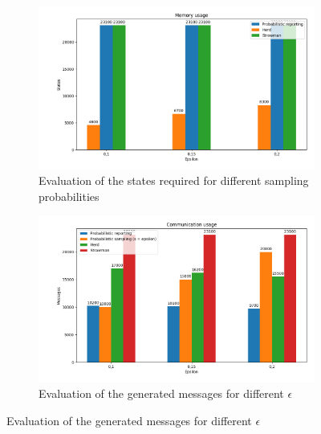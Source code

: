 \documentclass[11pt,oneside,a4paper]{article}
\begin{document}
\begin{figure}
	\centering
	\begin{subfigure}{.5\textwidth}
		\centering
		\includegraphics[width=\linewidth]{figures/required_states}
		\caption{Evaluation of the states required for different sampling probabilities}
		\label{fig:states_required}
	\end{subfigure}%
	\begin{subfigure}{.5\textwidth}
		\centering
		\includegraphics[width=\linewidth]{figures/generated_messages}
		\caption{Evaluation of the generated messages for different $\epsilon$}
		\label{fig:messages_generated}
	\end{subfigure}
\end{figure}
\end{document}
